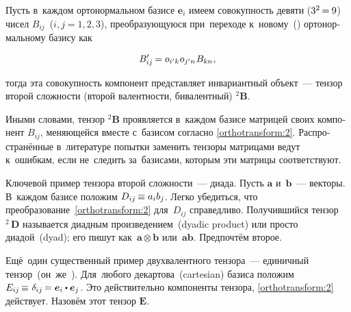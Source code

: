 \begin{otherlanguage}{russian}

Пусть в~каждом ортонормальном базисе ${\bm{e}_i}$ имеем совокупность девяти (${3^2 \hspace{-0.24ex}=\hspace{-0.12ex} 9}$) чисел ${B_{ij}}$~(${i, j = 1, 2, 3}$), преобразующуюся при~переходе к~новому~() ортонормальному базису как

\nopagebreak\vspace{-0.2em}\begin{equation}\label{orthotransform:2}
B'_{ij} \hspace{-0.16ex} = o_{i'k} \hspace{.1ex} o_{j'n} \hspace{.16ex} B_{kn} \hspace{0.1ex},
\end{equation}

\vspace{-0.2em} \noindent тогда эта совокупность компонент представляет инвариантный объект~--- тензор второй сложности (второй валентности, бивалентный) ${^2\!\bm{B}}$.


Иными словами, тензор ${^2\!\bm{B}}$ проявляется в~каждом базисе матрицей своих компонент ${B_{ij}}$, меняющейся вместе с~базисом согласно \eqref{orthotransform:2}. Распространённые в~литературе попытки заменить тензоры матрицами ведут к~ошибкам, если не~следить за~базисами, которым эти матрицы соответствуют.

Ключевой пример тензора второй сложности~--- диада. Пусть ${\bm{a}}$ и~${\bm{b}}$~--- векторы. В~каждом базисе положим ${D_{ij} \hspace{-0.2ex} \equiv a_i b_j}$. Легко убедиться, что преобразование~\eqref{orthotransform:2} для~${D_{ij}}$ справедливо. Получившийся тензор ${^2\!\!\,\bm{D}}$ называется диадным произведением~(dyadic product) или просто диадой~(dyad); его пишут как~${\bm{a} \otimes \bm{b}}$ или~${\bm{a} \bm{b}}$. Предпочтём второе.

Ещё~один существенный пример двухвалентного тензора~--- единичный тензор~(он~же~). Для~любого декартова~(cartesian) базиса положим ${E_{ij} \hspace{-0.2ex} \equiv \hspace{0.12ex} \delta_{ij} \hspace{-0.2ex} = \bm{e}_i \dotp \bm{e}_j}$. Это действительно компоненты тензора, \eqref{orthotransform:2} действует. Назовём этот тензор ${\bm{E}}$.


\end{otherlanguage}
